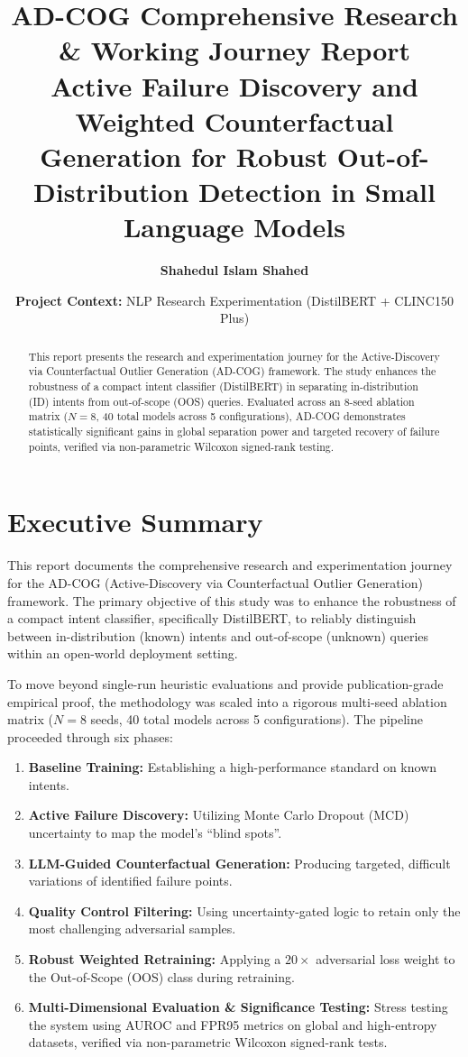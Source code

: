 \documentclass[11pt,a4paper]{article}
\title{\textbf{AD-COG Comprehensive Research \& Working Journey Report}\\
\large Active Failure Discovery and Weighted Counterfactual Generation for Robust Out-of-Distribution Detection in Small Language Models}
\author{\textbf{Shahedul Islam Shahed}}
\date{\small \textbf{Project Context:} NLP Research Experimentation (DistilBERT + CLINC150 Plus)\\
\textbf{} }
\begin{document}
\maketitle

\begin{abstract}
This report presents the research and experimentation journey for the Active-Discovery via Counterfactual Outlier Generation (AD-COG) framework. The study enhances the robustness of a compact intent classifier (DistilBERT) in separating in-distribution (ID) intents from out-of-scope (OOS) queries. Evaluated across an 8-seed ablation matrix ($N=8$, 40 total models across 5 configurations), AD-COG demonstrates statistically significant gains in global separation power and targeted recovery of failure points, verified via non-parametric Wilcoxon signed-rank testing.
\end{abstract}

\tableofcontents
\newpage

\section{Executive Summary}

This report documents the comprehensive research and experimentation journey for the AD-COG (Active-Discovery via Counterfactual Outlier Generation) framework. The primary objective of this study was to enhance the robustness of a compact intent classifier, specifically DistilBERT, to reliably distinguish between in-distribution (known) intents and out-of-scope (unknown) queries within an open-world deployment setting.

To move beyond single-run heuristic evaluations and provide publication-grade empirical proof, the methodology was scaled into a rigorous multi-seed ablation matrix ($N=8$ seeds, 40 total models across 5 configurations). The pipeline proceeded through six phases:
\begin{enumerate}[leftmargin=*]
    \item \textbf{Baseline Training:} Establishing a high-performance standard on known intents.
    \item \textbf{Active Failure Discovery:} Utilizing Monte Carlo Dropout (MCD) uncertainty to map the model's ``blind spots''.
    \item \textbf{LLM-Guided Counterfactual Generation:} Producing targeted, difficult variations of identified failure points.
    \item \textbf{Quality Control Filtering:} Using uncertainty-gated logic to retain only the most challenging adversarial samples.
    \item \textbf{Robust Weighted Retraining:} Applying a $20\times$ adversarial loss weight to the Out-of-Scope (OOS) class during retraining.
    \item \textbf{Multi-Dimensional Evaluation \& Significance Testing:} Stress testing the system using AUROC and FPR95 metrics on global and high-entropy datasets, verified via non-parametric Wilcoxon signed-rank tests.
\end{enumerate}
\end{document}
